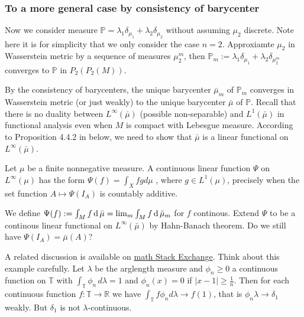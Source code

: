\subsubsection{To a more general case by consistency of barycenter}

Now we consider measure $\mathbb{P} = \lambda_1 \delta_{\mu_1} + \lambda_2 \delta_{\mu_2}$
without assuming $\mu_2$ discrete.
Note here it is for simplicity that we only consider the case $n=2$.
Approxiamte $\mu_2$ in Wasserstein metric by a sequence of measures $\mu_2^{m}$,
then $\mathbb{P}_m := \lambda_1 \delta_{\mu_1} + \lambda_2 \delta_{\mu_2^m}$ converges to $\mathbb{P}$
in $P_2(P_2(M))$.

By the consistency of barycenters, the unique barycenter $\bar{\mu}_m$ of $\mathbb{P}_m$
converges in Wasserstein metric (or just weakly) to the unique barycenter $\bar{\mu}$ of $\mathbb{P}$.
Recall that there is no duality between $L^{\infty}(\bar{\mu})$ (possible non-separable) and $L^1 (\bar{\mu})$
in functional analysis even when $M$ is compact with Lebesgue measure.
According to Proposition 4.4.2 in \cite{Bogachev2007} below, we need to show that $\bar{\mu}$ is a linear functional on $L^{\infty}(\bar{\mu})$.
\begin{prop}
	Let \( \mu \) be a finite nonnegative measure.
	A continuous linear function \( \Psi \) on \( L ^ { \infty } ( \mu ) \) has the form
	\( \Psi ( f ) = \int _ { X } f g d \mu \)
	, where \( g \in L ^ { 1 } ( \mu ) \),
	precisely when the set function \( A \mapsto \Psi \left( I _ { A } \right) \) is countably additive.
\end{prop}

We define $\Psi(f):= \int_M f \operatorname{d} \bar{\mu} = \lim_m \int_M f \operatorname{d} \bar{\mu}_m$ for $f$ continous.
Extend $\Psi$ to be a continous linear functional on $L^{\infty}(\bar{\mu})$ by Hahn-Banach theorem.
Do we still have $\Psi(I_A) = \bar{\mu}(A)$?

A related discussion is available on
\href{https://math.stackexchange.com/questions/574130/does-weak-convergence-with-uniformly-bounded-densities-imply-absolute-continuity/574888#574888}{math Stack Exchange}.
Think about this example carefully.
Let $\lambda$ be the arglength measure and $\phi_n \ge 0$ a continuous function on $\mathbb T$ with $\int_{\mathbb T} \phi_n\, d\lambda = 1$ and $\phi_n(x) = 0$ if $|x-1| \ge \frac 1n$. Then for each continuous function $f\colon \mathbb T \to \mathbb R$ we have $\int_{\mathbb T} f\phi_n d\lambda \to f(1)$, that is $\phi_n \lambda \to \delta_1$ weakly. But $\delta_1$ is not $\lambda$-continuous.

